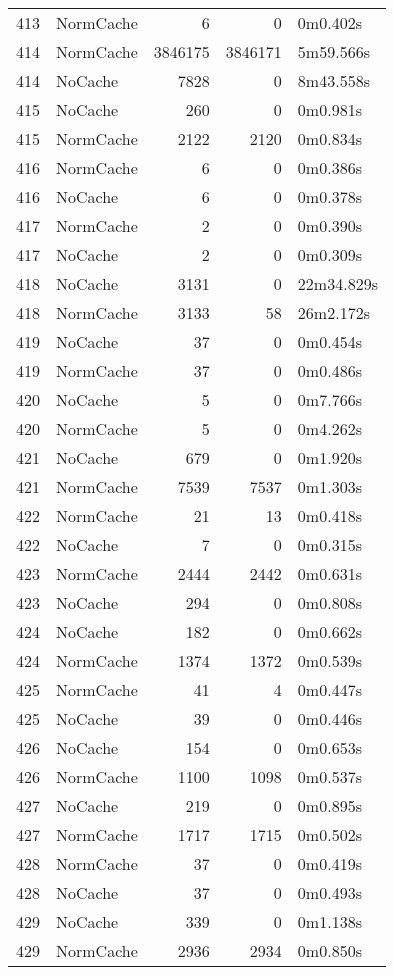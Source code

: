 \begin{tabular}{llrrl}
413 & NormCache & 6 & 0 & 0m0.402s \\
414 & NormCache & 3846175 & 3846171 & 5m59.566s \\
414 & NoCache & 7828 & 0 & 8m43.558s \\
415 & NoCache & 260 & 0 & 0m0.981s \\
415 & NormCache & 2122 & 2120 & 0m0.834s \\
416 & NormCache & 6 & 0 & 0m0.386s \\
416 & NoCache & 6 & 0 & 0m0.378s \\
417 & NormCache & 2 & 0 & 0m0.390s \\
417 & NoCache & 2 & 0 & 0m0.309s \\
418 & NoCache & 3131 & 0 & 22m34.829s \\
418 & NormCache & 3133 & 58 & 26m2.172s \\
419 & NoCache & 37 & 0 & 0m0.454s \\
419 & NormCache & 37 & 0 & 0m0.486s \\
420 & NoCache & 5 & 0 & 0m7.766s \\
420 & NormCache & 5 & 0 & 0m4.262s \\
421 & NoCache & 679 & 0 & 0m1.920s \\
421 & NormCache & 7539 & 7537 & 0m1.303s \\
422 & NormCache & 21 & 13 & 0m0.418s \\
422 & NoCache & 7 & 0 & 0m0.315s \\
423 & NormCache & 2444 & 2442 & 0m0.631s \\
423 & NoCache & 294 & 0 & 0m0.808s \\
424 & NoCache & 182 & 0 & 0m0.662s \\
424 & NormCache & 1374 & 1372 & 0m0.539s \\
425 & NormCache & 41 & 4 & 0m0.447s \\
425 & NoCache & 39 & 0 & 0m0.446s \\
426 & NoCache & 154 & 0 & 0m0.653s \\
426 & NormCache & 1100 & 1098 & 0m0.537s \\
427 & NoCache & 219 & 0 & 0m0.895s \\
427 & NormCache & 1717 & 1715 & 0m0.502s \\
428 & NormCache & 37 & 0 & 0m0.419s \\
428 & NoCache & 37 & 0 & 0m0.493s \\
429 & NoCache & 339 & 0 & 0m1.138s \\
429 & NormCache & 2936 & 2934 & 0m0.850s \\

\end{tabular}
